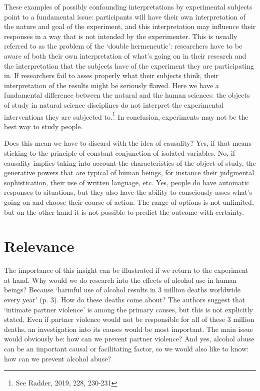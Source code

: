 \documentclass[twocolumn, serif, review, authordate]{jote-article}
\begin{document}
These examples of possibly confounding interpretations by experimental subjects point to a fundamental issue: participants will have their own interpretation of the nature and goal of the experiment, and this interpretation may influence their responses in a way that is not intended by the experimenter. This is usually referred to as the problem of the `double hermeneutic': researchers have to be aware of both their own interpretation of what's going on in their research and the interpretation that the subjects have of the experiment they are participating in. If researchers fail to asses properly what their subjects think, their interpretation of the results might be seriously flawed. Here we have a fundamental difference between the natural and the human sciences: the objects of study in natural science disciplines do not interpret the experimental interventions they are subjected to.\footnote{ See Radder, 2019, 228, 230-231} In conclusion, experiments may not be the best way to study people.

Does this mean we have to discard with the idea of causality? Yes, if that means sticking to the principle of constant conjunction of isolated variables. No, if causality implies taking into account the characteristics of the object of study, the generative powers that are typical of human beings, for instance their judgmental sophistication, their use of written language, etc. Yes, people do have automatic responses to situations, but they also have the ability to consciously asses what's going on and choose their course of action. The range of options is not unlimited, but on the other hand it is not possible to predict the outcome with certainty.


{}
\section*{Relevance}
\gotoreview
\label{sec:relevance}
\noindent The importance of this insight can be illustrated if we return to the experiment at hand. Why would we do research into the effects of alcohol use in human beings? Because `harmful use of alcohol results in 3 million deaths worldwide every year' (p. 3). How do these deaths come about? The authors suggest that `intimate partner violence' is among the primary causes, but this is not explicitly stated. Even if partner violence would not be responsible for all of these 3 million deaths, an investigation into its causes would be most important. The main issue would obviously be: how can we prevent partner violence? And yes, alcohol abuse can be an important causal or facilitating factor, so we would also like to know: how can we prevent alcohol abuse?
\end{document}
